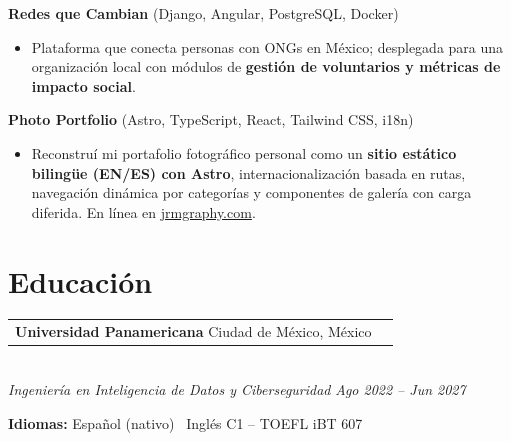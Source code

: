 \documentclass[10pt, letterpaper]{article}
\makeatletter
\newcommand{\entry}[2]{%
  \noindent\begin{tabular*}{\textwidth}{@{}l@{\extracolsep{\fill}}r@{}}
    #1 & #2
  \end{tabular*}}
\newenvironment{cvlist}{%
  \begin{itemize}[leftmargin=1.4em,itemsep=1pt,topsep=2pt,parsep=0pt]
}{\end{itemize}}
\makeatother
\begin{document}
\noindent\textbf{Redes que Cambian} (Django, Angular, PostgreSQL, Docker)

\begin{cvlist}
  \item Plataforma que conecta personas con ONGs en M\'{e}xico; desplegada
        para una organizaci\'{o}n local con m\'{o}dulos de \textbf{gesti\'{o}n de
        voluntarios y m\'{e}tricas de impacto social}.
\end{cvlist}

\smallskip

\noindent\textbf{Photo Portfolio} (Astro, TypeScript, React, Tailwind CSS, i18n)

\begin{cvlist}
  \item Reconstru\'{i} mi portafolio fotogr\'{a}fico personal como un
        \textbf{sitio est\'{a}tico biling\"{u}e (EN/ES) con Astro},
        internacionalizaci\'{o}n basada en rutas, navegaci\'{o}n din\'{a}mica
        por categor\'{i}as y componentes de galer\'{i}a con carga diferida.
        En l\'{i}nea en \href{https://jrmgraphy.com}{jrmgraphy.com}.
\end{cvlist}

\section{Educaci\'{o}n}

\entry{\textbf{Universidad Panamericana} \quad Ciudad de M\'{e}xico, M\'{e}xico}{}\\
\textit{Ingenier\'{i}a en Inteligencia de Datos y Ciberseguridad}
\hfill \textit{Ago 2022 -- Jun 2027}

\medskip

\noindent\textbf{Idiomas:} Espa\~{n}ol (nativo) \textbullet\ Ingl\'{e}s C1 -- TOEFL iBT 607
\end{document}

